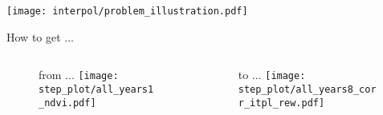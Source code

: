 \begin{frame}
    \centering
    \texttt{[image: interpol/problem\_illustration.pdf]}
\end{frame}


\begin{frame}[t]{How to get ...}
    \begin{columns}
        \begin{column}{0.45\textwidth}
            \begin{figure}
                \large from ...
                \texttt{[image: step\_plot/all\_years1\_ndvi.pdf]}
            \end{figure}
        \end{column}
        \begin{column}{0.45\textwidth}
            \begin{figure}
                \large to ...
                \texttt{[image: step\_plot/all\_years8\_corr\_itpl\_rew.pdf]}
            \end{figure}
        \end{column}
    \end{columns}
\end{frame}